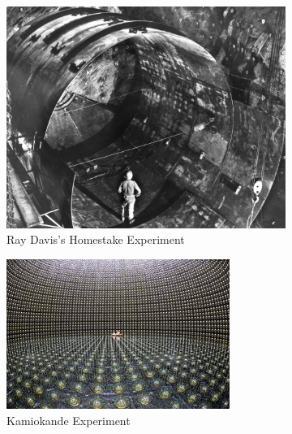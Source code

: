 \begin{figure}[htp]
\centering
	\begin{subfigure}[b]{.3\textwidth}
    \includegraphics[width=\textwidth]{figs/homestake.jpg}
    \caption{Ray Davis's Homestake Experiment}
    \label{fig:homestake}
    \end{subfigure}
    \quad
    \begin{subfigure}[b]{.3\textwidth}
    \includegraphics[width=\textwidth]{figs/kamiokande.jpg}
    \caption{Kamiokande Experiment}
    \label{fig:kamiokande}
    \end{subfigure}
    \quad
    \begin{subfigure}[b]{.3\textwidth}

\end{subfigure}
\end{figure}
